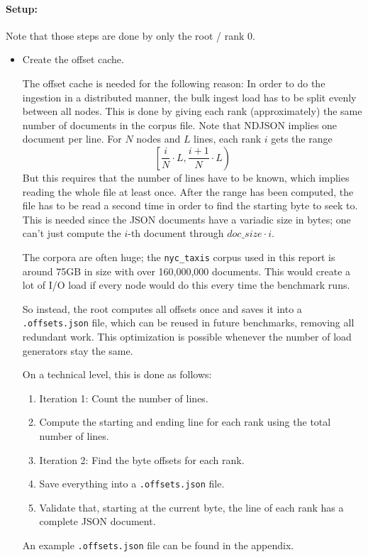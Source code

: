 \paragraph{Setup:}
Note that those steps are done by only the root / rank 0.
\begin{itemize}
  \item Create the offset cache.

    The offset cache is needed for the following reason: In order to do the ingestion in a distributed manner, the bulk ingest load has to be split evenly between all nodes. This is done by giving each rank (approximately) the same number of documents in the corpus file. Note that \ac{NDJSON} implies one document per line. For $N$ nodes and $L$ lines, each rank $i$ gets the range
    \[
      \left[ \frac{i}{N} \cdot L, \frac{i+1}{N} \cdot L \right)
    \]
    But this requires that the number of lines have to be known, which implies reading the whole file at least once. After the range has been computed, the file has to be read a second time in order to find the starting byte to seek to. This is needed since the \ac{JSON} documents have a variadic size in bytes; one can't just compute the $i$-th document through $doc\_size \cdot i$.

    The corpora are often huge; the \texttt{nyc\_taxis} corpus used in this report is around 75GB in size with over 160,000,000 documents. This would create a lot of I/O load if every node would do this every time the benchmark runs.

    So instead, the root computes all offsets once and saves it into a \texttt{.offsets.json} file, which can be reused in future benchmarks, removing all redundant work. This optimization is possible whenever the number of load generators stay the same.

    On a technical level, this is done as follows:
    \begin{enumerate}
      \item Iteration 1: Count the number of lines.
      \item Compute the starting and ending line for each rank using the total number of lines.
      \item Iteration 2: Find the byte offsets for each rank.
      \item Save everything into a \texttt{.offsets.json} file.
      \item Validate that, starting at the current byte, the line of each rank has a complete \ac{JSON} document.
    \end{enumerate}
    An example \texttt{.offsets.json} file can be found in the appendix.


\end{itemize}
